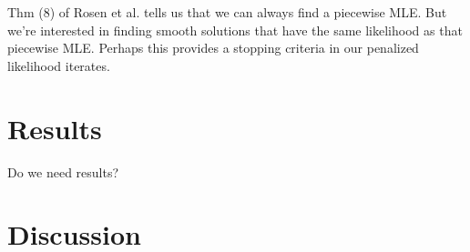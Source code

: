 \documentclass[11pt]{article}
\begin{document}
Thm (8) of Rosen et al. \cite{Rosen2018-bb} tells us that we can always find a piecewise MLE.
But we're interested in finding smooth solutions that have the same likelihood as that piecewise MLE.
Perhaps this provides a stopping criteria in our penalized likelihood iterates.


\section*{Results}\label{sec:results}

Do we need results?

\section*{Discussion}\label{sec:discussion}



\end{document}
